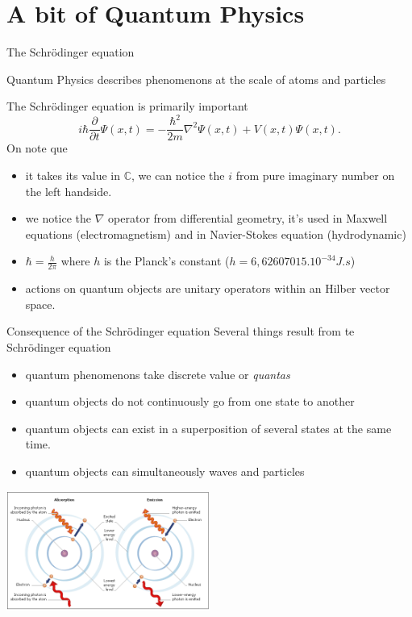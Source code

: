 \section{A bit of Quantum Physics}

\begin{frame}{The Schrödinger equation}

Quantum Physics describes phenomenons at the scale of atoms and particles\newline


The Schrödinger equation is primarily important
\begin{equation*}
        i\hbar\frac{\partial}{\partial t}\Psi(x,t)=-\frac{\hbar^2}{2m}\nabla^2\Psi(x,t)+V(x,t)\Psi(x,t).
\end{equation*} 
On note que
\begin{itemize}
    \item it takes its value in $\mathbb{C}$, we can notice the $i$ from pure imaginary number on the left handside. 
    \item we notice the $\nabla$ operator from differential geometry, it's used in Maxwell equations
    (electromagnetism) and in Navier-Stokes equation (hydrodynamic)
    \item $\hbar = \frac{h}{2\pi}$ where $h$ is the Planck's constant ($h = 6,62607015.10^{-34} J.s$) 
    \item actions on quantum objects are unitary operators within an Hilber vector space.
\end{itemize}
\end{frame}

\begin{frame}{Consequence of the Schrödinger equation}
Several things result from te Schrödinger equation 
\begin{itemize}
    \item quantum phenomenons take discrete value or \textit{quantas}
    \item quantum objects do not continuously go from one state to another
    \item quantum objects can exist in a superposition of several states at the same time.
    \item quantum objects can simultaneously waves and particles
\end{itemize}
\begin{center}
    \includegraphics[width=0.50\textwidth]{images/photon.png}    
\end{center}
\end{frame}

